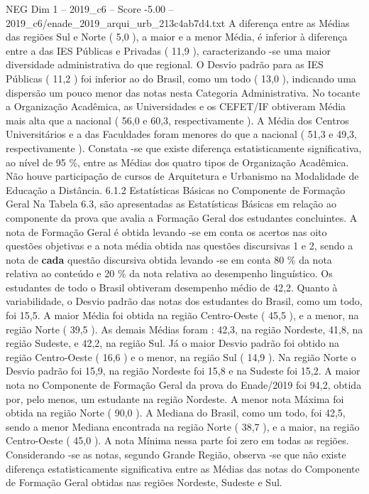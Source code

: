 \begin{textsample}{NEG Dim 1 – 2019\_c6 – Score -5.00 – 2019\_c6/enade\_2019\_arqui\_urb\_213c4ab7d4.txt}
A diferença entre as Médias das regiões Sul e Norte ( 5,0 ), a maior e a menor Média, é inferior à diferença entre a das IES Públicas e Privadas ( 11,9 ), caracterizando -se uma maior diversidade administrativa do que regional.
O Desvio padrão para as IES Públicas ( 11,2 ) foi inferior ao do Brasil, como um todo ( 13,0 ), indicando uma dispersão um pouco menor das notas nesta Categoria Administrativa.
No tocante a Organização Acadêmica, as Universidades e os CEFET/IF obtiveram Média mais alta que a nacional ( 56,0 e 60,3, respectivamente ).
A Média dos Centros Universitários e a das Faculdades foram menores do que a nacional ( 51,3 e 49,3, respectivamente ).
Constata -se que existe diferença estatisticamente significativa, ao nível de 95 \%, entre as Médias dos quatro tipos de Organização Acadêmica.
Não houve participação de cursos de Arquitetura e Urbanismo na Modalidade de Educação a Distância. 6.1.2 Estatísticas Básicas no Componente de Formação Geral Na Tabela 6.3, são apresentadas as Estatísticas Básicas em relação ao componente da prova que avalia a Formação Geral dos estudantes concluintes.
A nota de Formação Geral é obtida levando -se em conta os acertos nas oito questões objetivas e a nota média obtida nas questões discursivas 1 e 2, sendo a nota de \textbf{cada} questão discursiva obtida levando -se em conta 80 \% da nota relativa ao conteúdo e 20 \% da nota relativa ao desempenho linguístico.
Os estudantes de todo o Brasil obtiveram desempenho médio de 42,2.
Quanto à variabilidade, o Desvio padrão das notas dos estudantes do Brasil, como um todo, foi 15,5.
A maior Média foi obtida na região Centro-Oeste ( 45,5 ), e a menor, na região Norte ( 39,5 ).
As demais Médias foram : 42,3, na região Nordeste, 41,8, na região Sudeste, e 42,2, na região Sul.
Já o maior Desvio padrão foi obtido na região Centro-Oeste ( 16,6 ) e o menor, na região Sul ( 14,9 ).
Na região Norte o Desvio padrão foi 15,9, na região Nordeste foi 15,8 e na Sudeste foi 15,2.
A maior nota no Componente de Formação Geral da prova do Enade/2019 foi 94,2, obtida por, pelo menos, um estudante na região Nordeste.
A menor nota Máxima foi obtida na região Norte ( 90,0 ).
A Mediana do Brasil, como um todo, foi 42,5, sendo a menor Mediana encontrada na região Norte ( 38,7 ), e a maior, na região Centro-Oeste ( 45,0 ).
A nota Mínima nessa parte foi zero em todas as regiões.
Considerando -se as notas, segundo Grande Região, observa -se que não existe diferença estatisticamente significativa entre as Médias das notas do Componente de Formação Geral obtidas nas regiões Nordeste, Sudeste e Sul.

\end{textsample}
